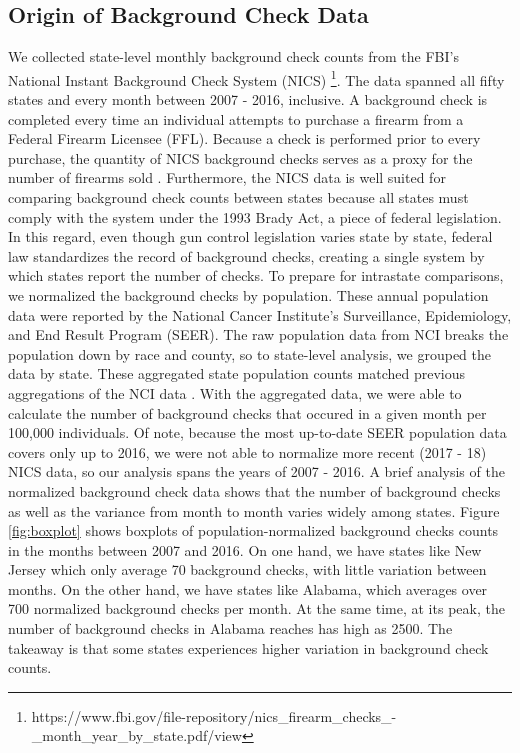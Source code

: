\documentclass[9pt,twocolumn,twoside,lineno]{pnas-new}
\begin{document}
\subsection*{Origin of Background Check Data}

We collected state-level monthly background check counts from the FBI’s National Instant Background Check System (NICS) \footnote{https://www.fbi.gov/file-repository/nics\_firearm\_checks\_-\_month\_year\_by\_state.pdf/view}. The data spanned all fifty states and every month between 2007 - 2016, inclusive. A background check is completed every time an individual attempts to purchase a firearm from a Federal Firearm Licensee  (FFL). Because a check is performed prior to every purchase, the quantity of NICS background checks serves as a proxy for the number of firearms sold \cite{pinsker_why_2017}. 
	Furthermore, the NICS data is well suited for comparing background check counts between states because all states must comply with the system under the 1993 Brady Act, a piece of federal legislation. In this regard, even though gun control legislation varies state by state, federal law standardizes the record of background checks, creating a single system by which states report the number of checks. 
	To prepare for intrastate comparisons, we normalized the background checks by population. These annual population data were reported by the National Cancer Institute’s Surveillance, Epidemiology, and End Result Program (SEER). The raw population data  from NCI breaks the population down by race and county, so to state-level analysis, we grouped the data by state. These aggregated state population counts matched previous aggregations of the NCI data \cite{levine_firearms_2017}. With the aggregated data, we were able to calculate the number of background checks that occured in a given month per 100,000 individuals. Of note, because the most up-to-date SEER population data covers only up to 2016, we were not able to normalize more recent (2017 - 18) NICS data, so our analysis spans the years of 2007 - 2016. 
    A brief analysis of the normalized background check data shows that the number of background checks as well as the variance from month to month varies widely among states. Figure \ref{fig:boxplot} shows boxplots of population-normalized background checks counts in the months between 2007 and 2016. On one hand, we have states like New Jersey which only average 70 background checks, with little variation between months. On the other hand, we have states like Alabama, which averages over 700 normalized background checks per month. At the same time, at its peak, the number of background checks in Alabama reaches has high as 2500. The takeaway is that some states experiences higher variation in background check counts. 
\end{document}
